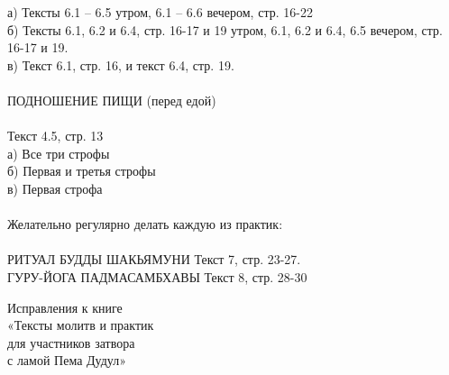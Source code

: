 \documentclass[4pt,oneside]{article}
\begin{document}
\indent а) Тексты 6.1 – 6.5 утром, 6.1 – 6.6 вечером, стр. 16-22\\
\indent б) Тексты 6.1, 6.2 и 6.4, стр. 16-17 и 19 утром, 6.1, 6.2 и 6.4, 6.5 вечером, стр. 16-17 и 19.\\
\indent в) Текст 6.1, стр. 16, и текст 6.4, стр. 19.\\
\\
ПОДНОШЕНИЕ ПИЩИ (перед едой)\\
\\
\indent Текст 4.5, стр. 13\\
\indent а) Все три строфы\\
\indent б) Первая и третья строфы \\
\indent в) Первая строфа\\
\\
Желательно регулярно делать каждую из практик:\\
\\
РИТУАЛ БУДДЫ ШАКЬЯМУНИ Текст 7, стр. 23-27.\\
ГУРУ-ЙОГА ПАДМАСАМБХАВЫ Текст 8, стр. 28-30

\newpage
   \thispagestyle{empty}

{\centering
\Large
Исправления к книге\\
«Тексты молитв и практик\\
для участников затвора\\
с ламой Пема Дудул»\\
}
\vspace{2cm}
\\
\noindent
\end{document}
